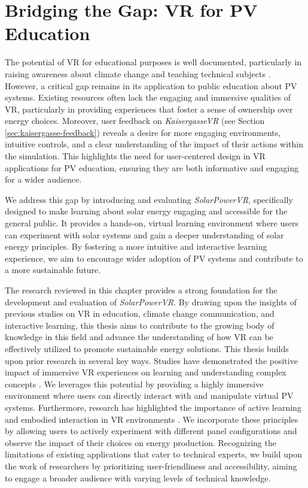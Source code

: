 \documentclass[draft, final]{vutinfth} %
\begin{document}
\section{Bridging the Gap: VR for PV Education}

The potential of VR for educational purposes is well documented, particularly in raising awareness about climate change and teaching technical subjects \cite{HuAu2018VrExperience, Merchant2014VrEffectiveness, Queiroz2023Efficacy, McEvoy2023Climate}. However, a critical gap remains in its application to public education about PV systems. Existing resources often lack the engaging and immersive qualities of VR, particularly in providing experiences that foster a sense of ownership over energy choices. 
Moreover, user feedback on \textit{KaisergasseVR} (see Section \ref{sec:kaisergasse-feedback}) reveals a desire for more engaging environments, intuitive controls, and a clear understanding of the impact of their actions within the simulation. This highlights the need for user-centered design in VR applications for PV education, ensuring they are both informative and engaging for a wider audience.

We address this gap by introducing and evaluating \textit{SolarPowerVR}, specifically designed to make learning about solar energy engaging and accessible for the general public. It provides a hands-on, virtual learning environment where users can experiment with solar systems and gain a deeper understanding of solar energy principles. By fostering a more intuitive and interactive learning experience, we aim to encourage wider adoption of PV systems and contribute to a more sustainable future.

The research reviewed in this chapter provides a strong foundation for the development and evaluation of \textit{SolarPowerVR}. By drawing upon the insights of previous studies on VR in education, climate change communication, and interactive learning, this thesis aims to contribute to the growing body of knowledge in this field and advance the understanding of how VR can be effectively utilized to promote sustainable energy solutions. This thesis builds upon prior research in several key ways. Studies have demonstrated the positive impact of immersive VR experiences on learning and understanding complex concepts \cite{Winn2002Immersion, Bailenson2008Transformations}. We leverages this potential by providing a highly immersive environment where users can directly interact with and manipulate virtual PV systems. Furthermore, research has highlighted the importance of active learning and embodied interaction in VR environments \cite{Queiroz2023Efficacy}. We incorporate these principles by allowing users to actively experiment with different panel configurations and observe the impact of their choices on energy production. Recognizing the limitations of existing applications that cater to technical experts, we build upon the work of researchers \cite{HuAu2018VrExperience} by prioritizing user-friendliness and accessibility, aiming to engage a broader audience with varying levels of technical knowledge.
\end{document}
